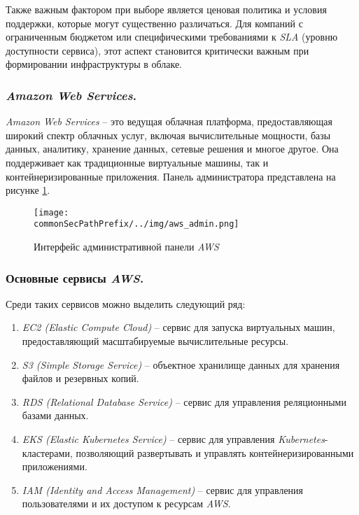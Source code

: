 Также важным фактором при выборе является ценовая политика и условия поддержки, которые могут существенно различаться. Для компаний с ограниченным бюджетом или специфическими требованиями к \textit{SLA} (уровню доступности сервиса), этот аспект становится критически важным при формировании инфраструктуры в облаке.

\subsubsection{\textit{Amazon Web Services}.}
\label{sec:aws}
\textit{Amazon Web Services} -- это ведущая облачная платформа, предоставляющая широкий спектр облачных услуг, включая вычислительные мощности, базы данных, аналитику, хранение данных, сетевые решения и многое другое. Она поддерживает как традиционные виртуальные машины, так и контейнеризированные приложения. Панель администратора представлена на рисунке \ref{fig:user_guide:aws_admin}.

\begin{figure}[ht]
    \centering
    \texttt{[image: \\commonSecPathPrefix/../img/aws\_admin.png]}
    \caption{Интерфейс административной панели \textit{AWS}}
    \label{fig:user_guide:aws_admin}
\end{figure}

\subsubsection{Основные сервисы \textit{AWS}.} Среди таких сервисов можно выделить следующий ряд:
\begin{enumerate}
    \item \textit{EC2 (Elastic Compute Cloud)} -- сервис для запуска виртуальных машин, предоставляющий масштабируемые вычислительные ресурсы.
    \item \textit{S3 (Simple Storage Service)} -- объектное хранилище данных для хранения файлов и резервных копий.
    \item \textit{RDS (Relational Database Service)} -- сервис для управления реляционными базами данных.
    \item \textit{EKS (Elastic Kubernetes Service)} -- сервис для управления \textit{Kubernetes}-кластерами, позволяющий развертывать и управлять контейнеризированными приложениями.
    \item \textit{IAM (Identity and Access Management)} -- сервис для управления пользователями и их доступом к ресурсам \textit{AWS}.
\end{enumerate}

